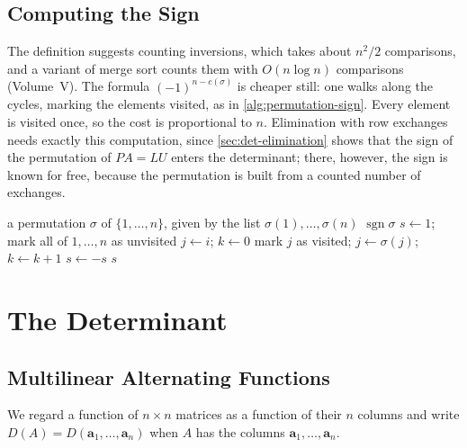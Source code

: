\subsection{Computing the Sign}

The definition suggests counting inversions, which takes about $n^2/2$ comparisons, and a variant of merge sort counts them with $O(n\log n)$ comparisons (Volume~V). The formula $(-1)^{n-c(\sigma)}$ is cheaper still: one walks along the cycles, marking the elements visited, as in \cref{alg:permutation-sign}. Every element is visited once, so the cost is proportional to $n$. Elimination with row exchanges needs exactly this computation, since \cref{sec:det-elimination} shows that the sign of the permutation of $PA=LU$ enters the determinant; there, however, the sign is known for free, because the permutation is built from a counted number of exchanges.

\begin{algorithm}
\begin{algorithmic}[1]
\Require a permutation $\sigma$ of $\{1,\ldots,n\}$, given by the list $\sigma(1),\ldots,\sigma(n)$
\Ensure $\operatorname{sgn}\sigma$
\State $s\gets1$; mark all of $1,\ldots,n$ as unvisited
   
    \State $j\gets i$; $k\gets0$
      \State mark $j$ as visited; $j\gets\sigma(j)$; $k\gets k+1$
    \EndWhile
     
      \State $s\gets-s$
    \EndIf
  \EndIf
\EndFor
\State \Return $s$
\end{algorithmic}
\caption{The sign of a permutation by its cycles (\cref{thm:sign-multiplicative}\,(ii) and (iii)). Each element is visited once, so the work is proportional to $n$, and $n$ marks are stored.}
\label{alg:permutation-sign}
\end{algorithm}

\section{The Determinant}
\label{sec:det-definition}

\subsection{Multilinear Alternating Functions}

We regard a function of $n\times n$ matrices as a function of their $n$ columns and write $D(A)=D(\mathbf a_1,\ldots,\mathbf a_n)$ when $A$ has the columns $\mathbf a_1,\ldots,\mathbf a_n$.

